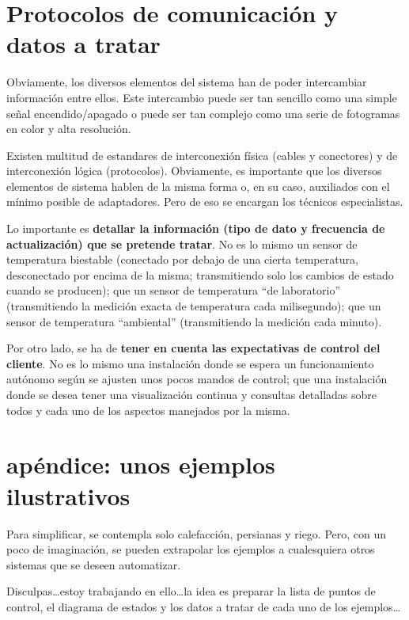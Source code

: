 \documentclass[spanish,10pt,a4paper,final,oneside]{article}
\begin{document}
\section{Protocolos de comunicación y datos a tratar}

Obviamente, los diversos elementos del sistema han de poder intercambiar información entre ellos. Este intercambio puede ser tan sencillo como una simple señal encendido/apagado o puede ser tan complejo como una serie de fotogramas en color y alta resolución.

Existen multitud de estandares de interconexión física (cables y conectores) y de interconexión lógica (protocolos). Obviamente, es importante que los diversos elementos de sistema hablen de la misma forma o, en su caso, auxiliados con el mínimo posible de adaptadores.
Pero de eso se encargan los técnicos especialistas.

Lo importante es \textbf{detallar la información (tipo de dato y frecuencia de actualización) que se pretende tratar}. No es lo mismo un sensor de temperatura biestable (conectado por debajo de una cierta temperatura, desconectado por encima de la misma; transmitiendo solo los cambios de estado cuando se producen); que un sensor de temperatura ``de laboratorio'' (transmitiendo la medición exacta de temperatura cada milisegundo); que un sensor de temperatura ``ambiental'' (transmitiendo la medición cada minuto).

Por otro lado, se ha de \textbf{tener en cuenta las expectativas de control del cliente}. No es lo mismo una instalación donde se espera un funcionamiento autónomo según se ajusten unos pocos mandos de control; que una instalación donde se desea tener una visualización continua y consultas detalladas sobre todos y cada uno de los aspectos manejados por la misma.


\section{apéndice: unos ejemplos ilustrativos}
Para simplificar, se contempla solo calefacción, persianas y riego. Pero, con un poco de imaginación, se pueden extrapolar los ejemplos a cualesquiera otros sistemas que se deseen automatizar.

\begin{footnotesize}Disculpas\ldots estoy trabajando en ello\ldots la idea es preparar la lista de puntos de control, el diagrama de estados y los datos a tratar de cada uno de los ejemplos\ldots \end{footnotesize}
\end{document}
